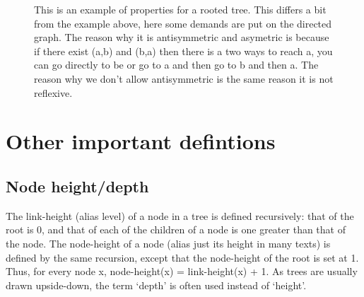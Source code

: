 \documentclass[a5paper]{article}
\begin{document}
\begin{figure}[ht]
	\centering
	\caption*{This is an example of properties for a rooted tree. This differs a bit from the example above, here some demands are put on the directed graph.
	 The reason why it is antisymmetric and asymetric is because if there exist (a,b) and (b,a) then there is a two ways to reach a, you can go directly to be or go to a and then go to b and then a. The reason why we don't allow antisymmetric is the same reason it is not reflexive.
	}\label{fig:2017_1-6-1}
\end{figure}
\section*{Other important defintions}
\subsection*{Node height/depth}
The link-height (alias level) of a node in a tree is defined recursively: that of the root is 0, and that of each of the children of a node is one greater than that of the node.
The node-height of a node (alias just its height in many texts) is defined by the same recursion, except that the node-height of the root is set at 1.
Thus, for every node x, node-height(x) = link-height(x) + 1. As trees are usually drawn upside-down, the term ‘depth’ is often used instead of ‘height’.
\end{document}
